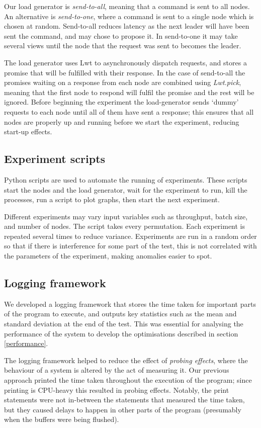 Our load generator is \textit{send-to-all}, meaning that a command is sent to all nodes. An alternative is \textit{send-to-one}, where a command is sent to a single node which is chosen at random. Send-to-all reduces latency as the next leader will have been sent the command, and may chose to propose it. In send-to-one it may take several views until the node that the request was sent to becomes the leader.

The load generator uses Lwt to asynchronously dispatch requests, and stores a promise that will be fulfilled with their response. In the case of send-to-all the promises waiting on a response from each node are combined using \textit{Lwt.pick}, meaning that the first node to respond will fulfil the promise and the rest will be ignored. Before beginning the experiment the load-generator sends `dummy' requests to each node until all of them have sent a response; this ensures that all nodes are properly up and running before we start the experiment, reducing start-up effects.

\subsection{Experiment scripts} \label{experimentscripts}
Python scripts are used to automate the running of experiments. These scripts start the nodes and the load generator, wait for the experiment to run, kill the processes, run a script to plot graphs, then start the next experiment.

Different experiments may vary input variables such as throughput, batch size, and number of nodes. The script takes every permutation. Each experiment is repeated several times to reduce variance. Experiments are run in a random order so that if there is interference for some part of the test, this is not correlated with the parameters of the experiment, making anomalies easier to spot.

\subsection{Logging framework}
We developed a logging framework that stores the time taken for important parts of the program to execute, and outputs key statistics such as the mean and standard deviation at the end of the test. This was essential for analysing the performance of the system to develop the optimisations described in section \ref{performance}.

The logging framework helped to reduce the effect of \textit{probing effects}, where the behaviour of a system is altered by the act of measuring it. Our previous approach printed the time taken throughout the execution of the program; since printing is CPU-heavy this resulted in probing effects. Notably, the print statements were not in-between the statements that measured the time taken, but they caused delays to happen in other parts of the program (presumably when the buffers were being flushed).

